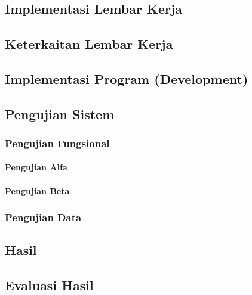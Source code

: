 \chapter{\babEmpat}

\section{Implementasi Lembar Kerja}

\section{Keterkaitan Lembar Kerja}

\section{Implementasi Program (Development)}

\section{Pengujian Sistem}
\subsection{Pengujian Fungsional}
\subsubsection{Pengujian Alfa}
\subsubsection{Pengujian Beta}

\subsection{Pengujian Data}

\section{Hasil}

\section{Evaluasi Hasil}
\lipsum[1]
